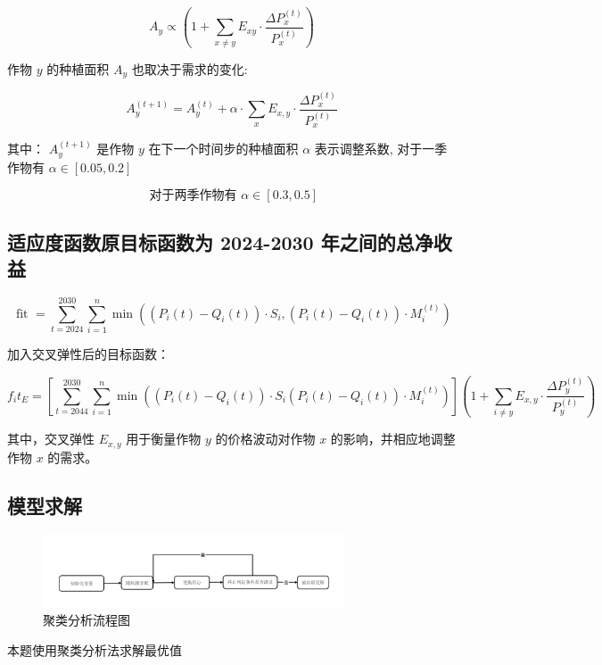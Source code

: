 \documentclass[12pt]{ctexart}
\begin{document}
\begin{equation}
	A_y \propto\left(1+\sum_{x \neq y} E_{x y} \cdot \frac{\Delta P_x^{(t)}}{P_x^{(t)}}\right)
\end{equation}
	
	
	作物 $y$ 的种植面积 $A_y$ 也取决于需求的变化:
	
\begin{equation}
	A_y^{(t+1)}=A_y^{(t)}+\alpha \cdot \sum_x E_{x, y} \cdot \frac{\Delta P_x^{(t)}}{P_x^{(t)}}
\end{equation}
	
	
	其中：
	$A_y^{(t+1)}$ 是作物 $y$ 在下一个时间步的种植面积
	$\alpha$ 表示调整系数, 对于一季作物有 $\alpha \in[0.05,0.2]$
	
\begin{equation}	
	\text { 对于两季作物有 } \alpha \in[0.3,0.5]
\end{equation}
	
	\subsection{适应度函数原目标函数为 2024-2030 年之间的总净收益}
	
	
\begin{equation}
	\text { fit }=\sum_{t=2024}^{2030} \sum_{i=1}^n \min \left(\left(P_i(t)-Q_i(t)\right) \cdot S_i,\left(P_i(t)-Q_i(t)\right) \cdot M_i^{(t)}\right)
\end{equation}
	
	
	加入交叉弹性后的目标函数：
	
\begin{equation*}
f_i t_E=\left[\sum_{t=2044}^{2030} \sum_{i=1}^n \min \left(\left(P_i(t)-Q_i(t)\right) \cdot S_i\left(P_i(t)-Q_i(t)\right) \cdot M_i^{(t)}\right)\right]\left(1+\sum_{i \neq y} E_{x, y} \cdot \frac{\Delta P_y^{(t)}}{P_y^{(t)}}\right)
\end{equation*}
	
	
	其中，交叉弹性 $E_{x, y}$ 用于衡量作物 $y$ 的价格波动对作物 $x$ 的影响，并相应地调整作物 $x$ 的需求。
	\subsection{模型求解}
		\begin{figure}[h]
		\centering
		\includegraphics[width=0.8\textwidth]{image17.png}  %
		\caption{聚类分析流程图}
		\label{fig:yield_comparison1}
	\end{figure}
	本题使用聚类分析法求解最优值
\end{document}
